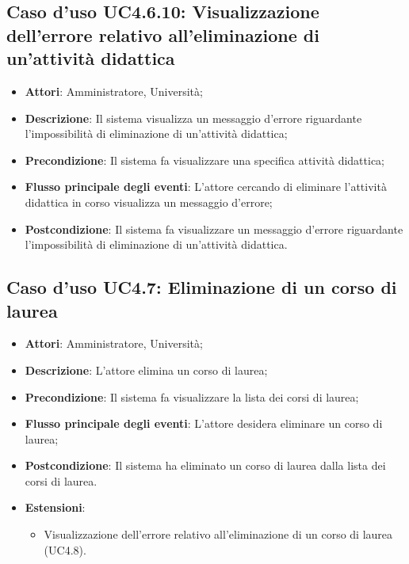 \subsection{Caso d'uso \texorpdfstring{UC4.6.10}{UC4.6.10}: Visualizzazione dell'errore relativo all'eliminazione di un'attività didattica}
\begin{itemize}
	\item \textbf{Attori}: Amministratore, Università;
	\item \textbf{Descrizione}: Il sistema visualizza un messaggio d'errore riguardante l'impossibilità di eliminazione di un'attività didattica;
	
	\item \textbf{Precondizione}: Il sistema fa visualizzare una specifica attività didattica;
	
	\item \textbf{Flusso principale degli eventi}: L'attore cercando di eliminare l'attività didattica in corso visualizza un messaggio d'errore;
	
	\item \textbf{Postcondizione}: Il sistema fa visualizzare un messaggio d'errore riguardante l'impossibilità di eliminazione di un'attività didattica.
	
\end{itemize}
\subsection{Caso d'uso \texorpdfstring{UC4.7}{UC4.7}: Eliminazione di un corso di laurea}
\begin{itemize}
	\item \textbf{Attori}: Amministratore, Università;
	\item \textbf{Descrizione}: L'attore elimina un corso di laurea;
	
	\item \textbf{Precondizione}: Il sistema fa visualizzare la lista dei corsi di laurea;
	
	
	\item \textbf{Flusso principale degli eventi}: L'attore desidera eliminare un corso di laurea;
	
	\item \textbf{Postcondizione}: Il sistema ha eliminato un corso di laurea dalla lista dei corsi di laurea.
	
	
	\item \textbf{Estensioni}:
	\begin{itemize}
		\item Visualizzazione dell'errore relativo all'eliminazione di un corso di laurea (UC4.8).
	\end{itemize}
\end{itemize}
